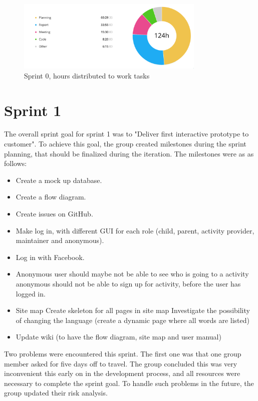 \begin{figure}[ht]
\centering
    \includegraphics[width=0.8\textwidth]{fig/sprint0-diagram}
\caption{Sprint 0, hours distributed to work tasks}
\end{figure}



\section{Sprint 1}
\label{sprint1}
The overall sprint goal for sprint 1 was to "Deliver first interactive prototype to customer". To achieve this goal, the group created milestones during the sprint planning, that should be finalized during the iteration. The milestones were as as follows:

\begin{itemize}
  \item Create a mock up database.
  \item Create a flow diagram.
  \item Create issues on GitHub.
  \item Make log in, with different GUI for each role (child, parent, activity      provider, maintainer and anonymous).
  \item Log in with Facebook.
  \item Anonymous user should maybe not be able to see who is going to a activity anonymous should not be able to sign up for activity, before the user has logged in.
  \item  Site map Create skeleton for all pages in site map Investigate the possibility of changing the language (create a dynamic page where all words are listed)
  \item Update wiki (to have the flow diagram, site map and user manual)
\end{itemize}
 
Two problems were encountered this sprint. The first one was that one group member asked for five days off to travel. The group concluded this was very inconvenient this early on in the development process, and all resources were necessary to complete the sprint goal. To handle such problems in the future, the group updated their risk analysis. 

